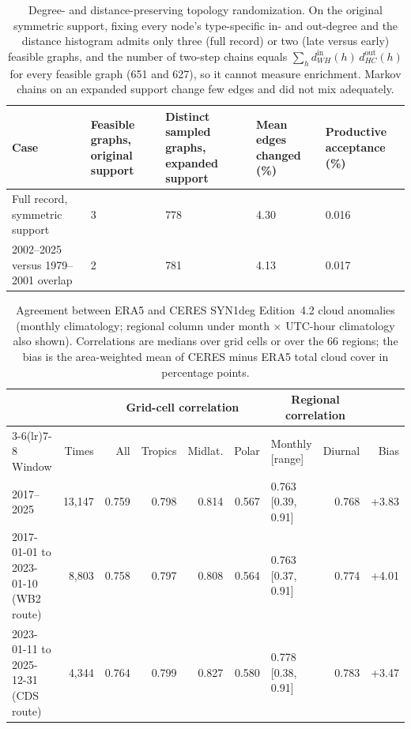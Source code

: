 \documentclass[11pt]{article}
\begin{document}
\begin{table}[htbp]
\centering
\caption{Degree- and distance-preserving topology randomization. On the original symmetric support, fixing every node's type-specific in- and out-degree and the distance histogram admits only three (full record) or two (late versus early) feasible graphs, and the number of two-step chains equals $\sum_h d^{\mathrm{in}}_{WH}(h)\,d^{\mathrm{out}}_{HC}(h)$ for every feasible graph (651 and 627), so it cannot measure enrichment. Markov chains on an expanded support change few edges and did not mix adequately.}
\label{tab:s14}
\scriptsize
\begin{tabular}{@{}p{}p{}p{}p{}p{}@{}}
\toprule
Case & Feasible graphs, original support & Distinct sampled graphs, expanded support & Mean edges changed (\%) & Productive acceptance (\%) \\
\midrule
Full record, symmetric support & 3 & 778 & 4.30 & 0.016 \\
2002--2025 versus 1979--2001 overlap & 2 & 781 & 4.13 & 0.017 \\
\bottomrule
\end{tabular}
\end{table}

\begin{table}[htbp]
\centering
\caption{Agreement between ERA5 and CERES SYN1deg Edition~4.2 cloud anomalies (monthly climatology; regional column under month $\times$ UTC-hour climatology also shown). Correlations are medians over grid cells or over the 66 regions; the bias is the area-weighted mean of CERES minus ERA5 total cloud cover in percentage points.}
\label{tab:s15}
\scriptsize
\begin{tabular}{@{}p{}rrrrrlrr@{}}
\toprule
& & \multicolumn{4}{c}{Grid-cell correlation} & \multicolumn{2}{c}{Regional correlation} & \\
\cmidrule(lr){3-6}\cmidrule(lr){7-8}
Window & Times & All & Tropics & Midlat. & Polar & Monthly [range] & Diurnal & Bias \\
\midrule
2017--2025 & 13,147 & 0.759 & 0.798 & 0.814 & 0.567 & 0.763 [0.39, 0.91] & 0.768 & +3.83 \\
2017-01-01 to 2023-01-10 (WB2 route) & 8,803 & 0.758 & 0.797 & 0.808 & 0.564 & 0.763 [0.37, 0.91] & 0.774 & +4.01 \\
2023-01-11 to 2025-12-31 (CDS route) & 4,344 & 0.764 & 0.799 & 0.827 & 0.580 & 0.778 [0.38, 0.91] & 0.783 & +3.47 \\
\bottomrule
\end{tabular}
\end{table}
\end{document}
